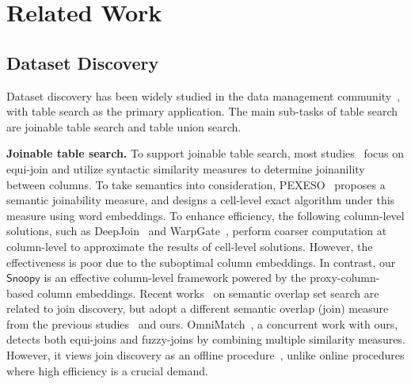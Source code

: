 \section{Related Work}
\label{sec:relatedwork}
\subsection{Dataset Discovery} 
Dataset discovery has been widely studied in the data management community~\cite{paton2023dataset, TabelDiscovery}, with table search  as the primary application. 
The main sub-tasks of table search are joinable table search and table union search.

\textbf{Joinable table search.}
To support joinable table search, most studies~\cite{Aurum, DatasetDiscovery,LSH,JOSIE,CrossDataDis,Correlation,MATE} focus on equi-join and utilize syntactic similarity measures to determine joinanility between columns. 
To take semantics into consideration, PEXESO~\cite{Pexeso} proposes a semantic joinability measure, and designs a cell-level exact algorithm under this measure using word embeddings. To enhance efficiency, the following column-level solutions, such as DeepJoin~\cite{Deepjoin} and WarpGate~\cite{WarpGate}, perform coarser computation at column-level to approximate the results of cell-level solutions. However, the effectiveness is poor due to the suboptimal column embeddings. In contrast, our $\textsf{Snoopy}$ is an effective column-level framework powered by the proxy-column-based column embeddings.
Recent works~\cite{koios,SilkMoth} on semantic overlap set search are related to join discovery, but adopt a different semantic overlap (join) measure from the previous studies~\cite{Deepjoin,Pexeso} and ours. 
OmniMatch~\cite{omnimatch}, a concurrent work with ours, detects both equi-joins and fuzzy-joins by combining multiple similarity measures. However, it views join discovery as an offline procedure~\cite{omnimatch}, unlike online procedures where high efficiency is a crucial demand.


